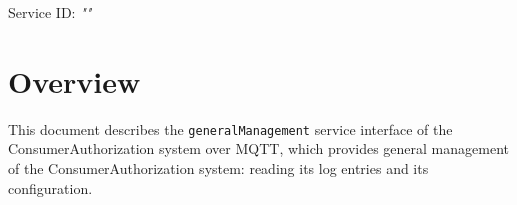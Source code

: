 \documentclass[a4paper]{arrowhead}
\begin{document}
\sloppy

\ArrowheadSetup

\begin{center}
  \vspace*{1cm}
  \huge{\arrowtitle}

  \vspace*{0.2cm}
  \LARGE{\arrowtype}
  \vspace*{1cm}

  \Large{Service ID: \textit{"\arrowid"}}

  \vspace*{\fill}


  \vspace*{1cm}
  \vspace*{\fill}

  \begin{abstract}
    This document describes the MQTT protocol with TLS payload security and JSON payload encoding variant of the \texttt{generalManagement} service of the ConsumerAuthorization system.
  \end{abstract}

  \vspace*{1cm}
\end{center}

\newpage

\tableofcontents
\newpage

\section{Overview}
\label{sec:overview}

This document describes the \texttt{generalManagement} service interface of the ConsumerAuthorization system over MQTT, which provides general management of the Consumer\allowbreak{}Authorization system: reading its log entries and its configuration.
\end{document}
